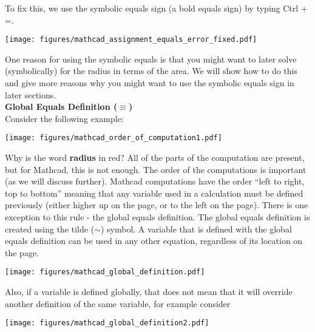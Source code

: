 To fix this, we use the symbolic equals sign (a bold equals sign) by typing Ctrl + =.

\begin{center}
\texttt{[image: figures/mathcad\_assignment\_equals\_error\_fixed.pdf]} %
\end{center}

One reason for using the symbolic equals is that you might want to later solve (symbolically) for the radius in terms of the area.  We will show how to do this and give more reasons why you might want to use the symbolic equals sign in later sections.   \\

\noindent \large \textsf{\textbf{Global Equals Definition ($\equiv$)}} \normalsize\\

Consider the following example:

\begin{center}
\texttt{[image: figures/mathcad\_order\_of\_computation1.pdf]} %
\end{center}

Why is the word {\bf radius} in red?  All of the parts of the computation are present, but for Mathcad, this is not enough.  The order of the computations is important (as we will discuss further).  Mathcad computations have the order ``left to right, top to bottom'' meaning that any variable used in a calculation must be defined previously (either higher up on the page, or to the left on the page).  There is one exception to this rule - the global equals definition.  The global equals definition is created using the tilde ($\sim$) symbol.  A variable that is defined with the global equals definition can be used in any other equation, regardless of its location on the page.  

\begin{center}
\texttt{[image: figures/mathcad\_global\_definition.pdf]} %
\end{center}

Also, if a variable is defined globally, that does not mean that it will override another definition of the same variable, for example consider

\begin{center}
\texttt{[image: figures/mathcad\_global\_definition2.pdf]} %
\end{center}


